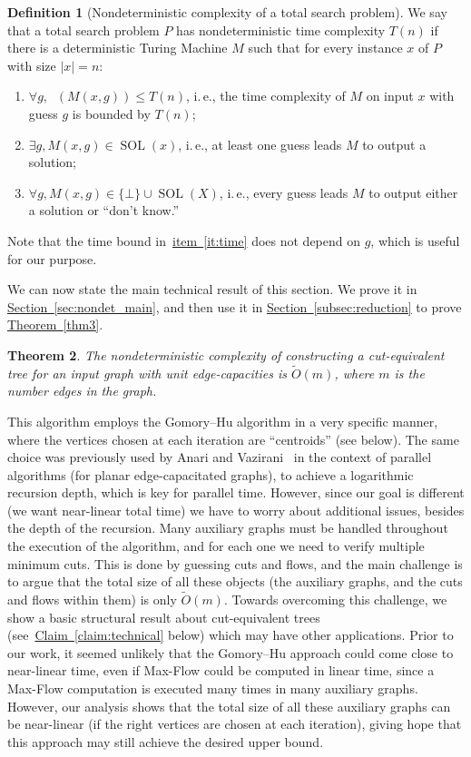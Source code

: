 \documentclass[11pt]{article}
\numberwithin{equation}{section}
\newtheorem{theorem}{Theorem}[section]
\theoremstyle{definition}
\newtheorem{definition}[theorem]{Definition}
\theoremstyle{plain}
\newcommand{\ie}{i.\,e.}
\newcommand{\expref}[2]{\hyperref[#2]{#1~\ref{#2}}}
\theoremstyle{plain}
\newcommand{\ProblemName}[1]{\textsf{#1}}
\newcommand{\MF}{\ProblemName{Max-Flow}\xspace}
\DeclareMathOperator{\SOL}{SOL}
\DeclareMathOperator{\THALT}{\mathsf{T_{HALT}}}
\newcommand\tO{\ensuremath{\widetilde O}}  %
\providecommand{\card}[1]{\lvert#1\rvert}
\begin{document}
\begin{definition}[Nondeterministic complexity of a total search problem]
We say that a total search problem $P$ has nondeterministic time complexity $T(n)$ if there is a deterministic Turing Machine $M$ such that for every instance $x$ of $P$ with size $\card{x}=n$:
\begin{enumerate}
\item \label{it:time}
  $\forall g, \THALT(M(x,g))\leq T(n)$,
  \ie, the time complexity of $M$ on input $x$ with guess $g$ is bounded by $T(n)$;
\item \label{it:a}
  $\exists g, M(x,g)\in \SOL(x)$, \ie, at least one guess leads $M$ to output a solution;
\item \label{it:b}
  $\forall g, M(x,g) \in \{\bot\}\cup \SOL(X)$, \ie, every guess leads $M$ to output either a solution or ``don't know.''
\end{enumerate}
Note that the time bound in~\expref{item}{it:time} does not depend on $g$, which is useful for our purpose.
\end{definition}

We can now state the main technical result of this section.
We prove it in \expref{Section}{sec:nondet_main},
and then use it in \expref{Section}{subsec:reduction} to prove \expref{Theorem}{thm3}.

\begin{theorem}\label{nondet:main}
The nondeterministic complexity of constructing a cut-equivalent tree
  for an input graph with unit edge-capacities is $\tO(m)$,
  where $m$ is the number edges in the graph.
\end{theorem}

This algorithm employs the Gomory--Hu algorithm in a very specific manner,
where the vertices chosen at each iteration are ``centroids'' (see below).
The same choice was previously used by Anari and Vazirani~\cite{AnariV18}
in the context of parallel algorithms (for planar edge-capacitated graphs),
to achieve a logarithmic recursion depth, which is key for parallel time.
However, since our goal is different (we want near-linear total time) we have to worry about additional issues, besides the depth of the recursion.
Many auxiliary graphs must be handled throughout the execution of the algorithm, and for each one we need to verify multiple minimum cuts.
This is done by guessing cuts and flows, and the main challenge is to argue that the total size of all these objects (the auxiliary graphs, and the cuts and flows within them) is only $\tO(m)$.
Towards overcoming this challenge, we show a basic structural result about cut-equivalent trees (see~\expref{Claim}{claim:technical} below) which may have other applications.
Prior to our work, it seemed unlikely that the Gomory--Hu approach could come close to near-linear time, even if \MF could be computed in linear time, since a \MF computation is executed many times in many auxiliary graphs.
However, our analysis shows that the total size of all these auxiliary graphs can be near-linear (if the right vertices are chosen at each iteration),
giving hope that this approach may still achieve the desired upper bound.
\end{document}
